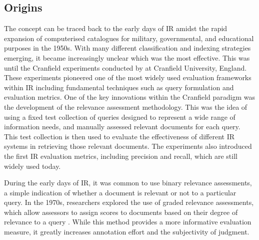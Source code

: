 \documentclass{l4proj}
\begin{document}
\subsection{Origins}
The concept can be traced back to the early days of IR amidst the rapid expansion of computerised catalogues for military, governmental, and educational purposes in the 1950s. With many different classification and indexing strategies emerging, it became increasingly unclear which was the most effective. This was until the Cranfield experiments conducted by \cite{cleverdon1967cranfield} at Cranfield University, England. These experiments pioneered one of the most widely used evaluation frameworks within IR including fundamental techniques such as query formulation and evaluation metrics. One of the key innovations within the Cranfield paradigm was the development of the relevance assessment methodology. This was the idea of using a fixed test collection of queries designed to represent a wide range of information needs, and manually assessed relevant documents for each query. This test collection is then used to evaluate the effectiveness of different IR systems in retrieving those relevant documents. The experiments also introduced the first IR evaluation metrics, including precision and recall, which are still widely used today. 

During the early days of IR, it was common to use binary relevance assessments, a simple indication of whether a document is relevant or not to a particular query. In the 1970s, researchers explored the use of graded relevance assessments, which allow assessors to assign scores to documents based on their degree of relevance to a query \citep{salton1971smart, robertson1976relvance}. While this method provides a more informative evaluation measure, it greatly increases annotation effort and the subjectivity of judgment.
\end{document}
